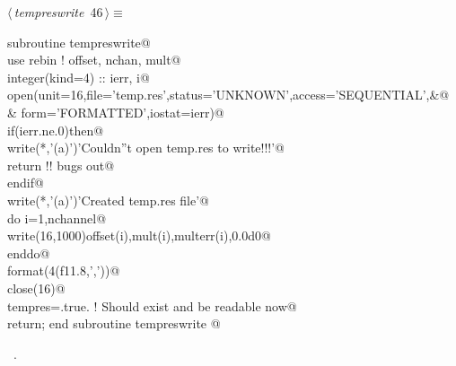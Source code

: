 \documentclass[10pt,a4paper,notitlepage]{article}
\begin{document}
\begin{flushleft} \small
\begin{minipage}{\linewidth}\label{scrap49}\raggedright\small
{} $\langle\,${\it tempreswrite}\nobreak\ {\footnotesize {46}}$\,\rangle\equiv$
\vspace{-1ex}
\begin{list}{}{} \item
\mbox{}\verb@    subroutine tempreswrite@\\
\mbox{}\verb@      use rebin ! offset, nchan, mult@\\
\mbox{}\verb@      integer(kind=4) :: ierr, i@\\
\mbox{}\verb@      open(unit=16,file='temp.res',status='UNKNOWN',access='SEQUENTIAL',&@\\
\mbox{}\verb@     & form='FORMATTED',iostat=ierr)@\\
\mbox{}\verb@      if(ierr.ne.0)then@\\
\mbox{}\verb@         write(*,'(a)')'Couldn''t open temp.res to write!!!'@\\
\mbox{}\verb@         return !! bugs out@\\
\mbox{}\verb@      endif@\\
\mbox{}\verb@      write(*,'(a)')'Created temp.res file'@\\
\mbox{}\verb@      do i=1,nchannel@\\
\mbox{}\verb@        write(16,1000)offset(i),mult(i),multerr(i),0.0d0@\\
\mbox{}\verb@      enddo@\\
\mbox{}  format(4(f11.8,','))@\\
\mbox{}\verb@      close(16)@\\
\mbox{}\verb@      tempres=.true. ! Should exist and be readable now@\\
\mbox{}\verb@      return; end subroutine tempreswrite                                    @{\NWsep}
\end{list}
\vspace{-1.5ex}
\footnotesize
\begin{list}{}{\setlength{\itemsep}{-\parsep}\setlength{\itemindent}{-\leftmargin}}
\item \NWtxtMacroRefIn\ .

\item{}
\end{list}
\end{minipage}\vspace{4ex}
\end{flushleft}
\end{document}
